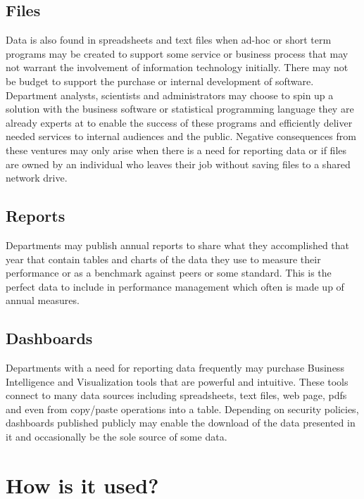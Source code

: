 \documentclass[
]{book}
\begin{document}
\hypertarget{files}{%
\subsection{Files}\label{files}}

Data is also found in spreadsheets and text files when ad-hoc or short term programs may be created to support some service or business process that may not warrant the involvement of information technology initially. There may not be budget to support the purchase or internal development of software. Department analysts, scientists and administrators may choose to spin up a solution with the business software or statistical programming language they are already experts at to enable the success of these programs and efficiently deliver needed services to internal audiences and the public. Negative consequences from these ventures may only arise when there is a need for reporting data or if files are owned by an individual who leaves their job without saving files to a shared network drive.

\hypertarget{reports}{%
\subsection{Reports}\label{reports}}

Departments may publish annual reports to share what they accomplished that year that contain tables and charts of the data they use to measure their performance or as a benchmark against peers or some standard. This is the perfect data to include in performance management which often is made up of annual measures.

\hypertarget{dashboards}{%
\subsection{Dashboards}\label{dashboards}}

Departments with a need for reporting data frequently may purchase Business Intelligence and Visualization tools that are powerful and intuitive. These tools connect to many data sources including spreadsheets, text files, web page, pdfs and even from copy/paste operations into a table. Depending on security policies, dashboards published publicly may enable the download of the data presented in it and occasionally be the sole source of some data.

\hypertarget{how-is-it-used}{%
\section{How is it used?}\label{how-is-it-used}}
\end{document}
